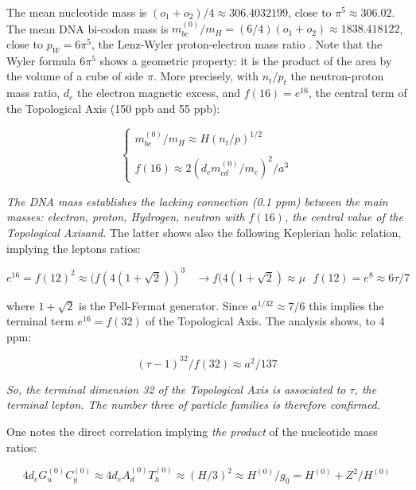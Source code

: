 \documentclass[a4paper,9pt]{article}
\newcounter{row}
\begin{document}
The mean nucleotide mass is $ (o_1 + o_2)/4 \approx 306.4032199$, close to $\pi^5 \approx 306.02$. The mean DNA bi-codon mass is $m_{bc}^{(0)}/m_H = (6/4)(o_1 + o_2) \approx 1838.418122$, close to $p_W = 6 \pi^5$, the Lenz-Wyler proton-electron mass ratio \cite{Wyler}. Note that the Wyler formula $6\pi^5$ shows a geometric property: it is the product of the area by the volume of a cube of side $\pi$. More precisely, with $n_t/p_t$ the neutron-proton mass ratio,  $d_e$ the electron magnetic excess, and $f(16)= e^{16}$, the central term of the Topological Axis (150 ppb and 55 ppb):
 
 \begin{equation}\label{Eq17}
 \left\{
    \begin{array}{ll}
       m_{bc}^{(0)}/m_H \approx H(n_t/p)^{1/2} \\
       \\
f(16) \approx 2(d_em_{cd}^{(0)}/m_e)^2 /a^3  
    \end{array}
\right.
\end{equation}

\textit{The DNA mass establishes the lacking connection (0.1 ppm) between the main masses: electron, proton, Hydrogen, neutron with $f(16)$, the central value of the Topological Axisand.} The latter shows also the following Keplerian holic relation, implying the leptons ratios: 

\begin{equation}\label{Eq18}
e^{16} = f(12)^2 \approx (f(4(1+\sqrt 2))^3 ~~~~ \rightarrow  f(4(1+\sqrt 2) \approx \mu ~~~ f(12) = e^8 \approx 6\tau/7
 \end{equation}

where $1+\sqrt 2$ is the Pell-Fermat generator. Since $a^{1/32}\approx 7/6$ this implies the terminal term $e^{16} = f(32)$ of the Topological Axis. The analysis shows, to 4 ppm:

\begin{equation}\label{Eq19}
(\tau -1)^{32}/f(32) \approx a^2/137
 \end{equation}

\textit{So, the terminal dimension 32 of the Topological Axis is associated to $\tau$, the terminal lepton. The number three of particle families is therefore confirmed.}

One notes the direct correlation implying \textit{the product} of the nucleotide mass ratios:

\begin{equation}\label{Eq20}
4d_e G_u^{(0)} C_y^{(0)} \approx 4d_e A_d^{(0)} T_h^{(0)} \approx (H/3)^2 \approx H^{(0)}/g_0 = H^{(0)} + Z^2/H^{(0)}
 \end{equation}
 
\end{document}
